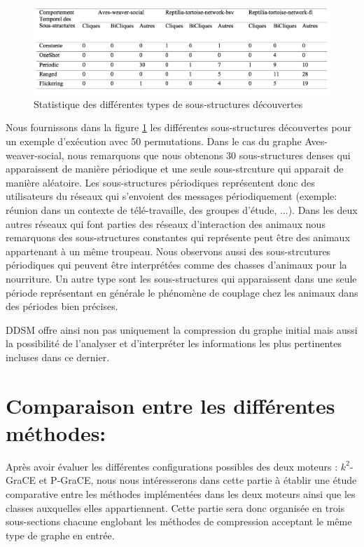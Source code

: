 	\begin{figure}[H]
		
		 \includegraphics[scale=0.38]{ressources/image/statDDSM.png}
			
			
			\caption{Statistique des différentes types de sous-structures découvertes}
			\label{fig:stat-DDSM}
		
	\end{figure}	
	
	Nous fournissons dans la figure \ref{fig:stat-DDSM} les différentes sous-structures découvertes pour un exemple d'exécution avec 50 permutations. Dans le cas du graphe Aves-weaver-social, nous remarquons que nous obtenons 30 sous-structures denses qui apparaissent de manière périodique et une seule sous-strcuture qui apparait de manière aléatoire. Les sous-structures périodiques représentent donc des utilisateurs du réseaux qui s'envoient des messages  périodiquement (exemple: réunion dans un contexte de télé-travaille, des groupes d'étude, ...). Dans les deux autres réseaux qui font parties des réseaux d'interaction des animaux nous remarquons des sous-structures constantes qui représente peut être des animaux appartenant à un même troupeau. Nous observons aussi des sous-strcutures périodiques qui peuvent être interprétées comme des chasses d'animaux pour la nourriture. Un autre type sont les sous-structures qui apparaissent dans une seule période représentant en générale le phénomène de couplage chez les animaux dans des périodes bien précises.
	
	DDSM offre ainsi non pas uniquement la compression du graphe initial mais aussi la possibilité de l'analyser et d'interpréter les informations les plus pertinentes incluses dans ce dernier.
	
	\section{Comparaison entre les différentes méthodes:}
	
	Après avoir évaluer les différentes configurations possibles des deux moteurs : $k^2$-GraCE et P-GraCE, nous nous intéresserons dans cette partie à établir une étude comparative entre les méthodes implémentées dans les deux moteurs ainsi que les classes auxquelles elles appartiennent. Cette partie sera donc organisée en trois sous-sections chacune englobant les méthodes de compression acceptant le même type de graphe en entrée.
	
